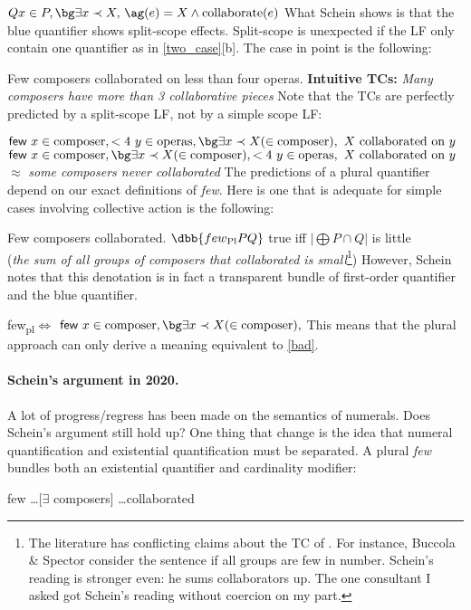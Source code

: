 \ex
\ljudge{$\checkmark$} $Q x\in P, {\bg \exists x\prec X,}\ \ag(e) = X \wedge \text{collaborate}(e)$
\xe
%
What Schein shows is that the {\bg blue} quantifier shows split-scope effects. Split-scope is unexpected if the LF only contain one quantifier as in \cref{two_case}[b]. The case in point is the following:

\pex
\a
Few composers collaborated on less than four operas.
\a 
\textbf{Intuitive TCs:}
\emph{Many composers have more than 3 collaborative pieces}
\xe
%
Note that the TCs are perfectly predicted by a split-scope LF, not by a simple scope LF:

\pex
\a 
$\textsf{few }x \in \text{composer}, <4\ y\in \text{operas}, {\bg \exists x\prec X (\in \text{composer})},\ X\text{ collaborated on }y$
\a 
$\textsf{few }x \in \text{composer}, {\bg \exists x\prec X (\in \text{composer})}, <4\ y\in \text{operas},\ X\text{ collaborated on }y$\label{bad}
$\approx$ \emph{some composers never collaborated}
\xe
%
The predictions of a plural quantifier depend on our exact definitions of \emph{few}. Here is one that is adequate for simple cases involving collective action is the following:

\pex
\a
Few composers collaborated.
\a 
$\dbb{few\textsubscript{Pl} P Q}$ true iff $|\bigoplus P\cap Q|$ is little\\
(\emph{the sum of all groups of composers that collaborated is small}\footnote{
The literature has conflicting claims about the TC of \cnextxa. For instance, Buccola \& Spector consider the sentence if all groups are few in number. Schein's reading is stronger even: he sums collaborators up. The one consultant I asked got Schein's reading without coercion on my part.
})
\xe
%
However, Schein notes that this denotation is in fact a transparent bundle of first-order quantifier and the {\bg blue} quantifier. 

\ex
 few\textsubscript{pl}$\Leftrightarrow$ $\textsf{few }x \in \text{composer}, {\bg \exists x\prec X (\in \text{composer})},$
\xe
%
This means that the plural approach can only derive a meaning equivalent to \cref{bad}.

\paragraph{Schein's argument in 2020.} 
A lot of progress/regress has been made on the semantics of numerals. Does Schein's argument still hold up? One thing that change is the idea that numeral quantification and existential quantification must be separated. A plural \emph{few} bundles both an existential quantifier and cardinality modifier:

\pex
\a 
few \ldots [$\exists$ composers] \ldots collaborated
\a 
\xe
%




